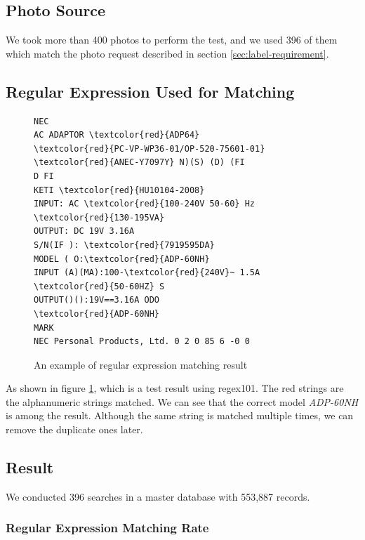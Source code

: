 \documentclass[technicalreport]{ieicej}
\begin{document}
    \subsection{Photo Source}
        We took more than 400 photos to perform the test, and we used 396 of them which match the photo request described in section \ref{sec:label-requirement}.

    \subsection{Regular Expression Used for Matching}

        \begin{figure}[t] 
            \begin{center}
                \begin{BVerbatim}[commandchars=\\\{\}]
NEC
AC ADAPTOR \textcolor{red}{ADP64}
\textcolor{red}{PC-VP-WP36-01/OP-520-75601-01}
\textcolor{red}{ANEC-Y7097Y} N)(S) (D) (FI
D FI
KETI \textcolor{red}{HU10104-2008}
INPUT: AC \textcolor{red}{100-240V 50-60} Hz \textcolor{red}{130-195VA}
OUTPUT: DC 19V 3.16A
S/N(IF ): \textcolor{red}{7919595DA}
MODEL ( O:\textcolor{red}{ADP-60NH}
INPUT (A)(MA):100-\textcolor{red}{240V}~ 1.5A \textcolor{red}{50-60HZ} S
OUTPUT()():19V==3.16A ODO
\textcolor{red}{ADP-60NH}
MARK
NEC Personal Products, Ltd. 0 2 0 85 6 -0 0
                \end{BVerbatim}
            \end{center}
            \caption{An example of regular expression matching result}
            \label{fig:result-regex}
        \end{figure}

        As shown in figure \ref{fig:result-regex}, which is a test result using regex101\cite{regex101}. The red strings are the alphanumeric strings matched. We can see that the correct model {\em ADP-60NH} is among the result. Although the same string is matched multiple times, we can remove the duplicate ones later.

    \subsection{Result}
            
        We conducted 396 searches in a master database with 553,887 records.

        \subsubsection{Regular Expression Matching Rate}
\end{document}
